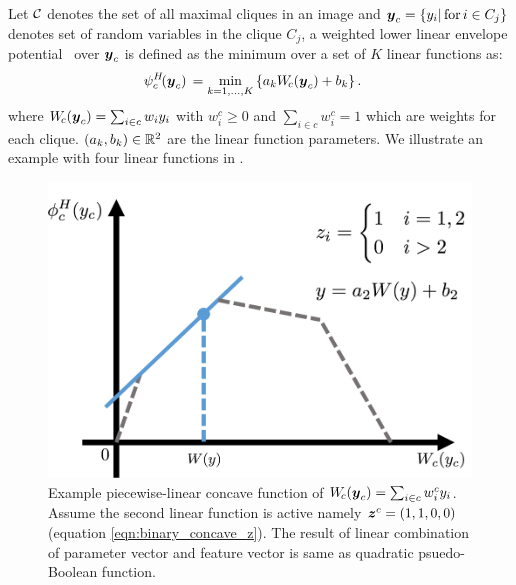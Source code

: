 \documentclass[sigconf, anonymous, review]{acmart}
\renewcommand{\cite}{\citep}
\begin{document}
Let $\cal C$ denotes the set of all maximal cliques in an image and
${\boldsymbol{y}}_c=\{y_i |\text{\,for\,} i \in C_j\}$ denotes set of random
variables in the clique $C_j$, a weighted lower linear envelope
potential~\cite{gouldlearning} over ${\boldsymbol{y}}_c$ is defined as the
minimum over a set of $K$ linear functions as:
%
\begin{align}
  \psi^H_c\!({\boldsymbol{y}}_c) \, &= \min_{k=1, \ldots, K} \left\{ a_k W_{\!c}({\boldsymbol{y}}_c) + b_k \right\}.
  \label{eqn:potential2}
\end{align}
%
where $W_{\!c}({\boldsymbol{y}}_c) = \sum_{i \in c} w_i y_i$ with $w^c_i \geq
0$ and $\sum_{i \in c} w^c_i = 1$ which are weights for each
clique. $(a_k, b_k) \in \mathbb{R}^2$ are the linear function
parameters. We illustrate an example with
four linear functions in .

\begin{figure}[t]
  \centering
  \includegraphics[width=0.8\columnwidth]{Methodology/figures/linEnvLatentFig.png}
  \caption{\label{fig:concave} Example piecewise-linear concave
    function of $W_{\!c}({\boldsymbol{y}}_c) = \sum_{i \in c} w^c_i y_i$.
    Assume the second linear function is active namely
    ${\boldsymbol{z}}^c=(1,1,0,0)$ (equation \ref{eqn:binary_concave_z}). The result of linear combination of
    parameter vector and feature vector is same as quadratic
    psuedo-Boolean function.}
\end{figure}

\end{document}

